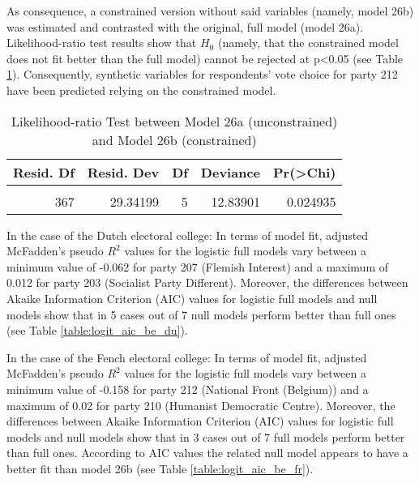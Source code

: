 \documentclass[
]{article}
\begin{document}
As consequence, a constrained version without said variables (namely, model 26b) was
estimated and contrasted with the original, full model (model 26a). Likelihood-ratio test results show
that \(H_0\) (namely, that the constrained model does not fit better than the full model) cannot be rejected at p\textless0.05
(see Table \ref{table:lrtest_1_be}). Consequently, synthetic variables for respondents' vote choice for
party 212 have been predicted relying on the constrained model.

\begin{table}[!h]

\caption{\label{tab:unnamed-chunk-12}Likelihood-ratio Test between Model 26a (unconstrained) and Model 26b (constrained)
                  \label{table:lrtest_1_be}}
\centering
\begin{tabular}[t]{r|r|r|r|r}
\hline
Resid. Df & Resid. Dev & Df & Deviance & Pr(>Chi)\\
\hline
\cellcolor{gray!6}{372} & \cellcolor{gray!6}{42.18100} & \cellcolor{gray!6}{} & \cellcolor{gray!6}{} & \cellcolor{gray!6}{}\\
\hline
367 & 29.34199 & 5 & 12.83901 & 0.024935\\
\hline
\end{tabular}
\end{table}

In the case of the Dutch electoral college:
In terms of model fit, adjusted McFadden's pseudo \(R^2\) values for the logistic full models vary between
a minimum value of
-0.062
for party 207
(Flemish Interest)
and a maximum of
0.012
for party 203
(Socialist Party Different). Moreover, the differences between Akaike Information Criterion (AIC) values for logistic full models and
null models show that in 5 cases out of 7 null models perform better than full ones (see Table \ref{table:logit_aic_be_du}).

In the case of the Fench electoral college:
In terms of model fit, adjusted McFadden's pseudo \(R^2\) values for the logistic full models vary between
a minimum value of
-0.158
for party 212
(National Front (Belgium))
and a maximum of
0.02
for party 210
(Humanist Democratic Centre). Moreover, the differences between Akaike Information Criterion (AIC) values for logistic full models and
null models show that in 3 cases out of 7 full models perform better than full ones. According to AIC
values the related null model appears to have a better fit than model 26b (see Table \ref{table:logit_aic_be_fr}).
\end{document}
